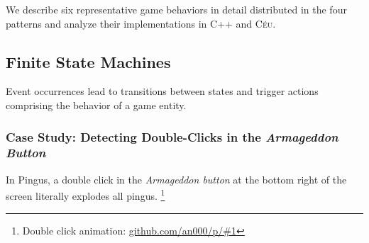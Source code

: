\documentclass[10pt, conference, compsocconf]{IEEEtran}
\newcommand{\CEU}{\textsc{C\'{e}u}\xspace}
\begin{document}
We describe six representative game behaviors in detail distributed in the four
patterns and analyze their implementations in C++ and \CEU.%

\subsection{Finite State Machines}
\label{sec.pats.fsms}

    Event occurrences lead to transitions between states and trigger actions
    comprising the behavior of a game entity.

\subsubsection{Case Study: Detecting Double-Clicks in the \emph{Armageddon Button}}


In Pingus, a double click in the \emph{Armageddon button} at the bottom right
of the screen literally explodes all pingus.%
\footnote{Double click animation: \url{github.com/an000/p/#1} }
\end{document}
